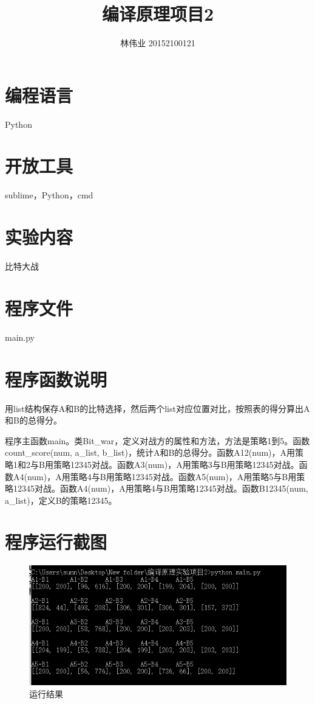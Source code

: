 \documentclass[]{article}
\title{编译原理项目2}
\author{林伟业 20152100121}
\begin{document}
\maketitle

\section{编程语言}

Python

\section{开放工具}

sublime，Python，cmd

\section{实验内容}
比特大战

\section{程序文件}

main.py

\section{程序函数说明}

用list结构保存A和B的比特选择，然后两个list对应位置对比，按照表的得分算出A和B的总得分。

程序主函数main。类Bit\_war，定义对战方的属性和方法，方法是策略1到5。函数count\_score(num, a\_list, b\_list)，统计A和B的总得分。函数A12(num)，A用策略1和2与B用策略12345对战。函数A3(num)，A用策略3与B用策略12345对战。函数A4(num)，A用策略4与B用策略12345对战。函数A5(num)，A用策略5与B用策略12345对战。函数A4(num)，A用策略4与B用策略12345对战。函数B12345(num, a\_list)，定义B的策略12345。

\section{程序运行截图}
\begin{figure}[h]
	\centering
	\includegraphics[width = 1\textwidth]{run.PNG}
	\caption{运行结果}
\end{figure}
\end{document}
